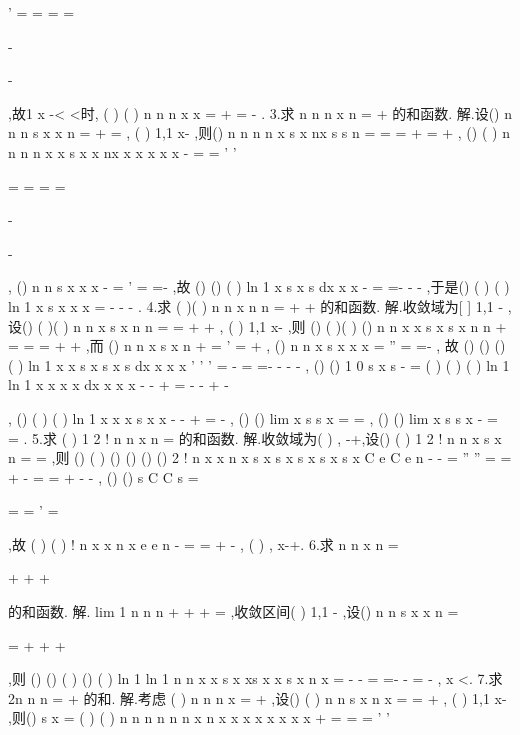 '
=
=
=
=




-


-


\sum 
\sum 
,故1
x
-<
<时, 
(
)
(
)
n
n
n
x
x
\infty 
=
+
=
-
\sum 
. 
3.求
n
n
n
x
n
\infty 
=
+
\sum 
的和函数. 
解.设()
n
n
n
s x
x
n
\infty 
=
+
=\sum 
,
(
)
1,1
x\in -
,则()
n
n
n
n
x
s x
nx
s
s
n
\infty 
\infty 
=
=
=
+
=
+
\sum 
\sum 
, 
()
(
)
n
n
n
n
x
x
s
x
x
nx
x
x
x
x
x
\infty 
\infty 
-
=
=
'
'




=
=
=
=




-


-


\sum 
\sum 
,
()
n
n
s
x
x
x
\infty 
-
=
'
=
=-
\sum 
,故 
()
()
(
)
ln 1
x
s
x
s
dx
x
x
-
=
=-
-
-
\int 
,于是()
(
)
(
)
ln 1
x
s x
x
x
=
-
-
-
. 
4.求
(
)(
)
n
n
x
n
n
\infty 
=
+
+
\sum 
的和函数. 
解.收敛域为[
]
1,1
-
,设()
(
)(
)
n
n
x
s x
n
n
\infty 
=
=
+
+
\sum 
,
(
)
1,1
x\in -
,则 
()
(
)(
)
()
n
n
x
x s x
s
x
n
n
+
\infty 
=
=
=
+
+
\sum 
,而
()
n
n
x
s
x
n
+
\infty 
=
'
=
+
\sum 
,
()
n
n
x
s
x
x
x
\infty 
=
''
=
=-
\sum 
, 
故
()
()
()
(
)
ln 1
x
x
s
x
s
x
s
dx
x
x
x
'
'
'
=
-
=
=-
-
-
-
\int 
,
()
()
1 0
s
x
s
-
= 
(
)
(
)
(
)
ln 1
ln 1
x
x
x
x dx
x
x
x
-
-
+
=
-
-
+
-




\int 
, ()
(
)
(
)
ln 1
x
x
x
s x
x
-
-
+
=
-
, 
()
()
lim
x
s
s x
\to 
=
=
, ()
()
lim
x
s
s x
-
\to 
=
=
. 
5.求
(
)
1 2
!
n
n
x
n
\infty 
=\sum 
的和函数. 
解.收敛域为(
)
,
-\infty +\infty ,设()
(
)
1 2
!
n
n
x
s x
n
\infty 
=
=\sum 
,则 
()
(
)
()
()
()
()
2 !
n
x
x
n
x
s
x
s x
s
x
s x
s x
C e
C e
n
-
\infty 
-
=
''
''
=
=
+\Rightarrow 
-
=\Rightarrow 
=
+
-
-
\sum 
, 
()
()
s
C
C
s
=

\Rightarrow 
=
=
'
=

,故
(
)
(
)
!
n
x
x
n
x
e
e
n
\infty 
-
=
=
+
-
\sum 
,
(
)
,
x\in -\infty +\infty . 
6.求
n
n
x
n
\infty 
=


+
+
+




\sum 
\Lambda 
的和函数. 
解.
lim 1
n
n
n
\to \infty 
+
+
+
=
\Lambda 
,收敛区间(
)
1,1
-
,设()
n
n
s x
x
n
\infty 
=


=
+
+
+




\sum 
\Lambda 
,则 
()
()
(
)
()
(
)
ln 1
ln 1
n
n
x
x
s x
xs x
x
s x
n
x
\infty 
=
-
-
=
=-
-
\Rightarrow 
=
-
\sum 
,
x <. 
7.求
2n
n
n
\infty 
=
+
\sum 
的和. 
解.考虑
(
)
n
n
n
x
\infty 
=
+
\sum 
,设()
(
)
n
n
s x
n
x
\infty 
=
=
+
\sum 
,
(
)
1,1
x\in -
,则()
s x = 
(
)
(
)
n
n
n
n
n
n
x
n
x
x
x
x
x
x
x
x
\infty 
\infty 
\infty 
+
=
=
=
'
'




